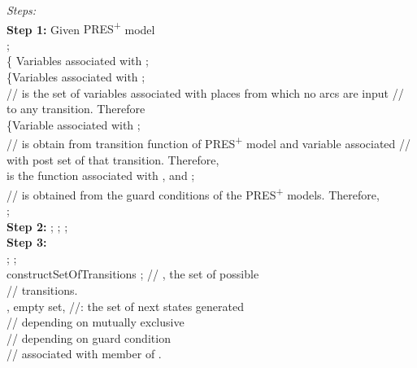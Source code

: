 \documentclass[9pt,executive]{article}
\def\presp{PRES\textsuperscript{+}}
\def\algofunction{constructSetOfTransitions}
\def\presp{PRES\textsuperscript{+}}
\def\algofunction{constructSetOfTransitions}
\begin{document}
\noindent
{\it Steps:}\\
{\bf Step 1:} Given {\presp} model\\
\hspace*{0.42in} ;\\
\hspace*{0.42in}  \{ Variables associated with ;\\
\hspace*{0.42in}  \{Variables associated with ;\\ 
\hspace*{0.42in} //  is the set of variables  associated with places from which no arcs are input 
\hspace*{0.42in} // to any transition. Therefore \\
\hspace*{0.42in}  \{Variable associated with ;\\
\hspace*{0.42in} //  is obtain from transition function of {\presp} model and variable associated
\hspace*{0.42in} // with post set of that transition. Therefore,\\ 
\hspace*{0.42in}  is the function associated with  
\hspace*{0.48in} ,  and ;\\ 
\hspace*{0.42in} //  is obtained from the guard conditions  of the {\presp} models. Therefore,\\
\hspace*{0.42in} ;\\ 
{\bf Step 2:} ; ; ;\\
{\bf Step 3:}  \\
\newpage
\hspace*{0.25in}{\bf Step 3.1:}  ;    ;\\
\hspace*{0.81in} {\algofunction} ; // , the set of possible\\
\hspace*{2.84in} // transitions.\\
\hspace*{0.81in}, empty set, //: the set of next states generated \\
\hspace*{2.01in} // depending on  mutually exclusive\\
\hspace*{2.01in} // depending on guard condition\\ 
\hspace*{2.01in} // associated with member of .\\  
\end{document}
